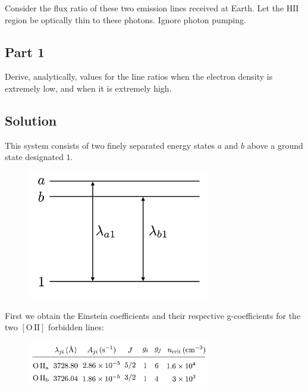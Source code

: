 \documentclass[12pt]{article}
\begin{document}
Consider the flux ratio of these two emission lines received at Earth. Let the $\mathrm{HII}$ region be optically thin to these photons. Ignore photon pumping.


\subsection*{Part 1}

Derive, analytically, values for the line ratios when the electron density is extremely low, and when it is extremely high.


\subsection*{Solution}

This system consists of two finely separated energy states $a$ and $b$ above a ground state designated $1$.

\begin{figure}[h] \label{fig:states}
\includegraphics[width=8cm]{states.png}
\centering
\caption{}
\end{figure}

First we obtain the Einstein coefficients and their respective g-coefficients for the two $\mathrm{[O\,II]}$ forbidden lines:

\begin{figure}[h] \label{fig:table}
\includegraphics[width=8cm]{table.png}
\centering
\caption{}
\end{figure}
\end{document}
